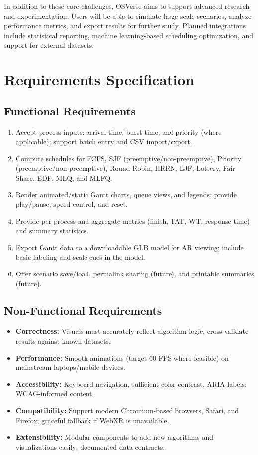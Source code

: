 \documentclass[12pt,a4paper,oneside]{report}
\begin{document}
In addition to these core challenges, OSVerse aims to support advanced research and experimentation. Users will be able to simulate large-scale scenarios, analyze performance metrics, and export results for further study. Planned integrations include statistical reporting, machine learning-based scheduling optimization, and support for external datasets.

\section{Requirements Specification}
\subsection*{Functional Requirements}
\begin{enumerate}
  \item Accept process inputs: arrival time, burst time, and priority (where applicable); support batch entry and CSV import/export.
  \item Compute schedules for FCFS, SJF (preemptive/non-preemptive), Priority (preemptive/non-preemptive), Round Robin, HRRN, LJF, Lottery, Fair Share, EDF, MLQ, and MLFQ.
  \item Render animated/static Gantt charts, queue views, and legends; provide play/pause, speed control, and reset.
  \item Provide per-process and aggregate metrics (finish, TAT, WT, response time) and summary statistics.
  \item Export Gantt data to a downloadable GLB model for AR viewing; include basic labeling and scale cues in the model.
  \item Offer scenario save/load, permalink sharing (future), and printable summaries (future).
\end{enumerate}

\subsection*{Non-Functional Requirements}
\begin{itemize}
  \item \textbf{Correctness:} Visuals must accurately reflect algorithm logic; cross-validate results against known datasets.
  \item \textbf{Performance:} Smooth animations (target 60 FPS where feasible) on mainstream laptops/mobile devices.
  \item \textbf{Accessibility:} Keyboard navigation, sufficient color contrast, ARIA labels; WCAG-informed content.
  \item \textbf{Compatibility:} Support modern Chromium-based browsers, Safari, and Firefox; graceful fallback if WebXR is unavailable.
  \item \textbf{Extensibility:} Modular components to add new algorithms and visualizations easily; documented data contracts.
\end{itemize}
\end{document}
